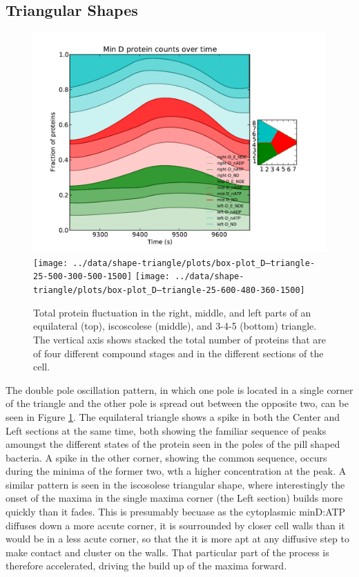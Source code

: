 \documentclass[letterpaper,twocolumn,amsmath,amssymb,pre]{revtex4-1}
\begin{document}
\subsection{Triangular Shapes}
\begin{figure}
  \includegraphics[width=\columnwidth]{../data/shape-triangle/plots/box-plot_D--triangle-25-400-400-400-1500}
  \texttt{[image: ../data/shape-triangle/plots/box-plot\_D--triangle-25-500-300-500-1500]}
  \texttt{[image: ../data/shape-triangle/plots/box-plot\_D--triangle-25-600-480-360-1500]}
  \caption{Total protein fluctuation in the right, middle, and left
    parts of an equilateral (top), iscoscolese (middle), and 3-4-5
    (bottom) triangle.  The vertical axis shows stacked the total
    number of proteins that are of four different compound stages and
    in the different sections of the cell.}
  \label{box-triangle}
\end{figure}

The double pole oscillation pattern, in which one pole is located in a
single corner of the triangle and the other pole is spread out between
the opposite two, can be seen in Figure \ref{box-triangle}.  The
equilateral triangle shows a spike in both the Center and Left
sections at the same time, both showing the familiar sequence of peaks
amoungst the different states of the protein seen in the poles of the
pill shaped bacteria.  A spike in the other corner, showing the common
sequence, occurs during the minima of the former two, wth a higher
concentration at the peak.  A similar pattern is seen in the
iscosolese triangular shape, where interestingly the onset of the
maxima in the single maxima corner (the Left section) builds more
quickly than it fades.  This is presumably becuase as the cytoplasmic
minD:ATP diffuses down a more accute corner, it is sourrounded by
closer cell walls than it would be in a less acute corner, so that the
it is more apt at any diffusive step to make contact and cluster on
the walls.  That particular part of the process is therefore
accelerated, driving the build up of the maxima forward.
\end{document}
